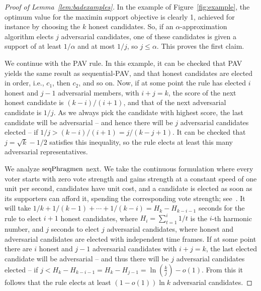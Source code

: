 \begin{proof}[Proof of Lemma~\ref{lem:badexamples}]
In the example of Figure~\ref{fig:example}, the optimum value for the maximin support objective is clearly 1, achieved for instance by choosing the $k$ honest candidates. 
So, if an $\alpha$-approximation algorithm elects $j$ adversarial candidates, one of these candidates is given a support of at least $1/\alpha$ and at most $1/j$, so $j\leq \alpha$. This proves the first claim.

We continue with the PAV rule. In this example, it can be checked that PAV yields the same result as sequential-PAV, and that honest candidates are elected in order, i.e., $c_1$, then $c_2$, and so on. 
Now, if at some point the rule has elected $i$ honest and $j-1$ adversarial members, with $i+j=k$, the score of the next honest candidate is $(k-i)/(i+1)$, and that of the next adversarial candidate is $1/j$. 
As we always pick the candidate with highest score, the last candidate will be adversarial -- and hence there will be $j$ adversarial candidates elected -- if $1/j > (k-i)/(i+1)=j/(k-j+1)$. 
It can be checked that $j=\sqrt{k}-1/2$ satisfies this inequality, so the rule elects at least this many adversarial representatives. 

We analyze $\operatorname{seqPhragmen}$ next. We take the continuous formulation where every voter starts with zero vote strength and gains strength at a constant speed of one unit per second, candidates have unit cost, and a candidate is elected as soon as its supporters can afford it, spending the corresponding vote strength; see~\cite{lackner2020approval}.  
It will take $1/k+1/(k-1)+\cdots + 1/(k-i)= H_k - H_{k-i-1}$ seconds for the rule to elect $i+1$ honest candidates, where $H_i=\sum_{t=1}^i 1/t$ is the $i$-th harmonic number, and $j$ seconds to elect $j$ adversarial candidates, where honest and adversarial candidates are elected with independent time frames. 
If at some point there are $i$ honest and $j-1$ adversarial candidates with $i+j=k$, the last elected candidate will be adversarial -- and thus there will be $j$ adversarial candidates elected -- if $j< H_k - H_{k-i-1} = H_k - H_{j-1}=\ln(\frac{k}{j}) -o(1)$. 
From this it follows that the rule elects at least $(1-o(1)) \ln k$ adversarial candidates.


\end{proof}
